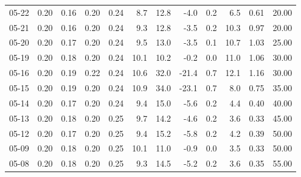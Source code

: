 \begin{threeparttable}
{\begin{tabular}{lrrrrrrrrrrr}
  05-22 &          0.20 &          0.16 &          0.20 &        0.24 &                 8.7 &                12.8 &       -4.0 &                 0.2 &              6.5 &            0.61 &                  20.00 \\
  05-21 &          0.20 &          0.16 &          0.20 &        0.24 &                 9.3 &                12.8 &       -3.5 &                 0.2 &             10.3 &            0.97 &                  20.00 \\
  05-20 &          0.20 &          0.17 &          0.20 &        0.24 &                 9.5 &                13.0 &       -3.5 &                 0.1 &             10.7 &            1.03 &                  25.00 \\
  05-19 &          0.20 &          0.18 &          0.20 &        0.24 &                10.1 &                10.2 &       -0.2 &                 0.0 &             11.0 &            1.06 &                  30.00 \\
  05-16 &          0.20 &          0.19 &          0.22 &        0.24 &                10.6 &                32.0 &      -21.4 &                 0.7 &             12.1 &            1.16 &                  30.00 \\
  05-15 &          0.20 &          0.19 &          0.20 &        0.24 &                10.9 &                34.0 &      -23.1 &                 0.7 &              8.0 &            0.75 &                  35.00 \\
  05-14 &          0.20 &          0.17 &          0.20 &        0.24 &                 9.4 &                15.0 &       -5.6 &                 0.2 &              4.4 &            0.40 &                  40.00 \\
  05-13 &          0.20 &          0.18 &          0.20 &        0.25 &                 9.7 &                14.2 &       -4.6 &                 0.2 &              3.6 &            0.33 &                  45.00 \\
  05-12 &          0.20 &          0.17 &          0.20 &        0.25 &                 9.4 &                15.2 &       -5.8 &                 0.2 &              4.2 &            0.39 &                  50.00 \\
  05-09 &          0.20 &          0.18 &          0.20 &        0.25 &                10.1 &                11.0 &       -0.9 &                 0.0 &              3.5 &            0.33 &                  50.00 \\
  05-08 &          0.20 &          0.18 &          0.20 &        0.25 &                 9.3 &                14.5 &       -5.2 &                 0.2 &              3.6 &            0.35 &                  55.00 \\

\end{tabular}}
\end{threeparttable}
